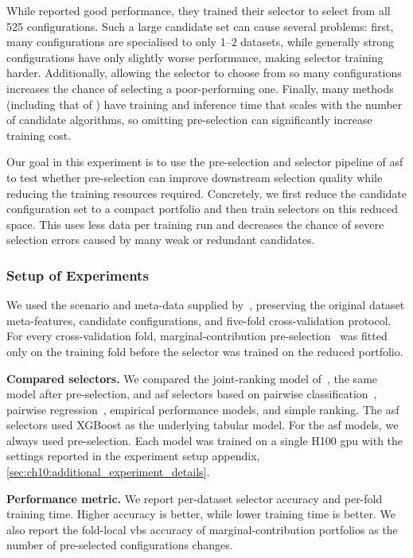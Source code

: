 While \citet{OztEtAl22} reported good performance, they trained their selector to select from all 525 configurations. Such a large candidate set can cause several problems: first, many configurations are specialised to only 1--2 datasets, while generally strong configurations have only slightly worse performance, making selector training harder.
Additionally, allowing the selector to choose from so many configurations increases the chance of selecting a poor-performing one.
Finally, many methods (including that of \citet{OztEtAl22}) have training and inference time that scales with the number of candidate algorithms, so omitting pre-selection can significantly increase training cost.

Our goal in this experiment is to use the pre-selection and selector pipeline of \gls{asf} to test whether pre-selection can improve downstream selection quality while reducing the training resources required.
Concretely, we first reduce the candidate configuration set to a compact portfolio and then train selectors on this reduced space. This uses less data per training run and decreases the chance of severe selection errors caused by many weak or redundant candidates.

\subsubsection{Setup of Experiments}
We used the scenario and meta-data supplied by~\citet{OztEtAl22}, preserving the original dataset meta-features, candidate configurations, and five-fold cross-validation protocol. For every cross-validation fold, marginal-contribution pre-selection~\citep{XuEtAl08} was fitted only on the training fold before the selector was trained on the reduced portfolio.

\textbf{Compared selectors.} We compared the joint-ranking model of~\citet{OztEtAl22}, the same model after pre-selection, and \gls{asf} selectors based on pairwise classification~\citep{XuEtAl12}, pairwise regression~\citep{KerEtAl18}, empirical performance models, and simple ranking. The \gls{asf} selectors used XGBoost as the underlying tabular model. For the \gls{asf} models, we always used pre-selection. Each model was trained on a single H100 \gls{gpu} with the settings reported in the experiment setup appendix, \cref{sec:ch10:additional_experiment_details}.

\textbf{Performance metric.} We report per-dataset selector accuracy and per-fold training time. Higher accuracy is better, while lower training time is better. We also report the fold-local \gls{vbs} accuracy of marginal-contribution portfolios as the number of pre-selected configurations changes.

